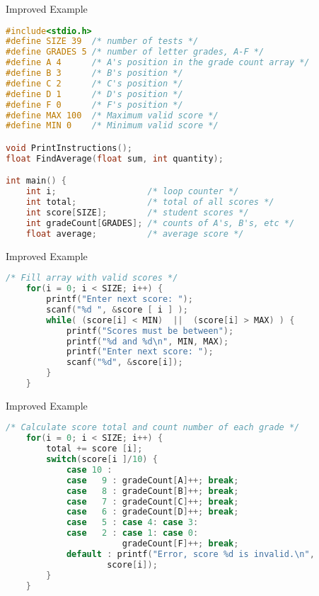 \documentclass[graphics]{beamer}
\begin{document}
\begin{frame}[fragile]{Improved Example}
    \begin{lstlisting}[language=C,basicstyle=\footnotesize,keywordstyle=\color{blue},commentstyle=\color{green},showstringspaces=false,stringstyle=\color{red}]
#include<stdio.h>
#define SIZE 39  /* number of tests */
#define GRADES 5 /* number of letter grades, A-F */
#define A 4      /* A's position in the grade count array */
#define B 3      /* B's position */
#define C 2      /* C's position */
#define D 1      /* D's position */
#define F 0      /* F's position */
#define MAX 100  /* Maximum valid score */
#define MIN 0    /* Minimum valid score */

void PrintInstructions();
float FindAverage(float sum, int quantity);

int main() {
    int i;                  /* loop counter */
    int total;              /* total of all scores */
    int score[SIZE];        /* student scores */
    int gradeCount[GRADES]; /* counts of A's, B's, etc */
    float average;          /* average score */
    \end{lstlisting}
\end{frame}

\begin{frame}[fragile]{Improved Example}
    \begin{lstlisting}[language=C,basicstyle=\footnotesize,keywordstyle=\color{blue},commentstyle=\color{green},showstringspaces=false,stringstyle=\color{red}]
    /* Fill array with valid scores */
    for(i = 0; i < SIZE; i++) {
        printf("Enter next score: ");
        scanf("%d ", &score [ i ] );
        while( (score[i] < MIN)  ||  (score[i] > MAX) ) {
            printf("Scores must be between");
            printf("%d and %d\n", MIN, MAX);
            printf("Enter next score: ");
            scanf("%d", &score[i]);
        }
    }
    \end{lstlisting}
\end{frame}

\begin{frame}[fragile]{Improved Example}
    \begin{lstlisting}[language=C,basicstyle=\footnotesize,keywordstyle=\color{blue},commentstyle=\color{green},showstringspaces=false,stringstyle=\color{red}]
    /* Calculate score total and count number of each grade */
    for(i = 0; i < SIZE; i++) {
        total += score [i];
        switch(score[i ]/10) {
            case 10 :
            case   9 : gradeCount[A]++; break;
            case   8 : gradeCount[B]++; break;
            case   7 : gradeCount[C]++; break;
            case   6 : gradeCount[D]++; break;
            case   5 : case 4: case 3:
            case   2 : case 1: case 0:
                       gradeCount[F]++; break;
            default : printf("Error, score %d is invalid.\n",
                    score[i]);
        }
    }
    \end{lstlisting}
\end{frame}
\end{document}
